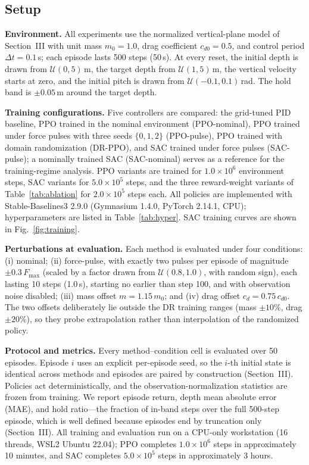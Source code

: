 \documentclass[conference]{IEEEtran}
\begin{document}
\subsection{Setup}
\textbf{Environment.} All experiments use the normalized vertical-plane model of Section~III with unit mass $m_0 = 1.0$, drag coefficient $c_{d0} = 0.5$, and control period $\Delta t = 0.1$\,s; each episode lasts 500 steps (50\,s). At every reset, the initial depth is drawn from $\mathcal{U}(0, 5)$\,m, the target depth from $\mathcal{U}(1, 5)$\,m, the vertical velocity starts at zero, and the initial pitch is drawn from $\mathcal{U}(-0.1, 0.1)$\,rad. The hold band is $\pm 0.05$\,m around the target depth.

\textbf{Training configurations.} Five controllers are compared: the grid-tuned PID baseline, PPO trained in the nominal environment (PPO-nominal), PPO trained under force pulses with three seeds $\{0, 1, 2\}$ (PPO-pulse), PPO trained with domain randomization (DR-PPO), and SAC trained under force pulses (SAC-pulse); a nominally trained SAC (SAC-nominal) serves as a reference for the training-regime analysis. PPO variants are trained for $1.0\times10^{6}$ environment steps, SAC variants for $5.0\times10^{5}$ steps, and the three reward-weight variants of Table~\ref{tab:ablation} for $2.0\times10^{5}$ steps each. All policies are implemented with Stable-Baselines3 2.9.0 (Gymnasium 1.4.0, PyTorch 2.14.1, CPU); hyperparameters are listed in Table~\ref{tab:hyper}. SAC training curves are shown in Fig.~\ref{fig:training}.

\textbf{Perturbations at evaluation.} Each method is evaluated under four conditions: (i) nominal; (ii) force-pulse, with exactly two pulses per episode of magnitude $\pm 0.3\,F_{\max}$ (scaled by a factor drawn from $\mathcal{U}(0.8, 1.0)$, with random sign), each lasting 10 steps (1.0\,s), starting no earlier than step 100, and with observation noise disabled; (iii) mass offset $m = 1.15\,m_0$; and (iv) drag offset $c_d = 0.75\,c_{d0}$. The two offsets deliberately lie outside the DR training ranges (mass $\pm 10\%$, drag $\pm 20\%$), so they probe extrapolation rather than interpolation of the randomized policy.

\textbf{Protocol and metrics.} Every method--condition cell is evaluated over 50 episodes. Episode $i$ uses an explicit per-episode seed, so the $i$-th initial state is identical across methods and episodes are paired by construction (Section~III). Policies act deterministically, and the observation-normalization statistics are frozen from training. We report episode return, depth mean absolute error (MAE), and hold ratio---the fraction of in-band steps over the full 500-step episode, which is well defined because episodes end by truncation only (Section~III). All training and evaluation run on a CPU-only workstation (16 threads, WSL2 Ubuntu 22.04); PPO completes $1.0\times10^{6}$ steps in approximately 10 minutes, and SAC completes $5.0\times10^{5}$ steps in approximately 3 hours.
\end{document}
